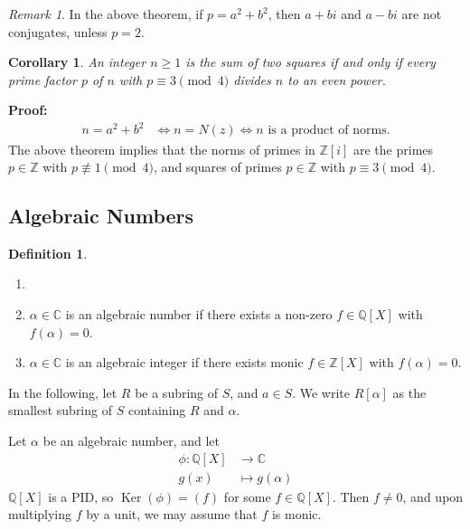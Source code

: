 \documentclass[12pt]{article}
\DeclareMathOperator{\Ker}{Ker}
\newtheorem{corollary}{Corollary}[section]
\theoremstyle{definition}
\newtheorem{definition}{Definition}[section]
\theoremstyle{remark}
\newtheorem*{remark}{Remark}
\begin{document}
\begin{remark}
	In the above theorem, if $p = a^2 + b^2$, then $a + bi$ and $a - bi$ are not conjugates, unless $p = 2$.
\end{remark}

\begin{corollary}
	An integer $n \geq 1$ is the sum of two squares if and only if every prime factor $p$ of $n$ with $p \equiv 3 \pmod 4$ divides $n$ to an even power.
\end{corollary}

\begin{adjustbox}{minipage = \columnwidth - 25.5pt, margin=1em, frame=1pt, margin=0em}
\textbf{Proof:}
\begin{align*}
	n = a^2 + b^2 &\iff n = N(z) \iff n \text{ is a product of norms}.
\end{align*}
The above theorem implies that the norms of primes in $\mathbb{Z}[i]$ are the primes $p \in \mathbb{Z}$ with $p \not \equiv 1 \pmod 4$, and squares of primes $p \in \mathbb{Z}$ with $p \equiv 3 \pmod 4$.
\end{adjustbox}

\newpage

\subsection{Algebraic Numbers}%
\label{sub:algebraic_numbers}

\begin{definition}
	\begin{enumerate}[label = (\roman*)]
		\item[]
		\item $\alpha \in \mathbb{C}$ is an algebraic number if there exists a non-zero $f \in \mathbb{Q}[X]$ with $f(\alpha) = 0$.
		\item $\alpha \in \mathbb{C}$ is an algebraic integer if there exists monic $f \in \mathbb{Z}[X]$ with $f(\alpha) = 0$.
	\end{enumerate}
\end{definition}

In the following, let $R$ be a subring of $S$, and $a \in S$. We write $R[\alpha]$ as the smallest subring of $S$ containing $R$ and $\alpha$.

Let $\alpha$ be an algebraic number, and let
\begin{align*}
	\phi : \mathbb{Q}[X] &\to \mathbb{C} \\
	g(x) &\mapsto g(\alpha)
\end{align*}
$\mathbb{Q}[X]$ is a PID, so $\Ker(\phi) = (f)$ for some $f \in \mathbb{Q}[X]$. Then $f \neq 0$, and upon multiplying $f$ by a unit, we may assume that $f$ is monic.
\end{document}
